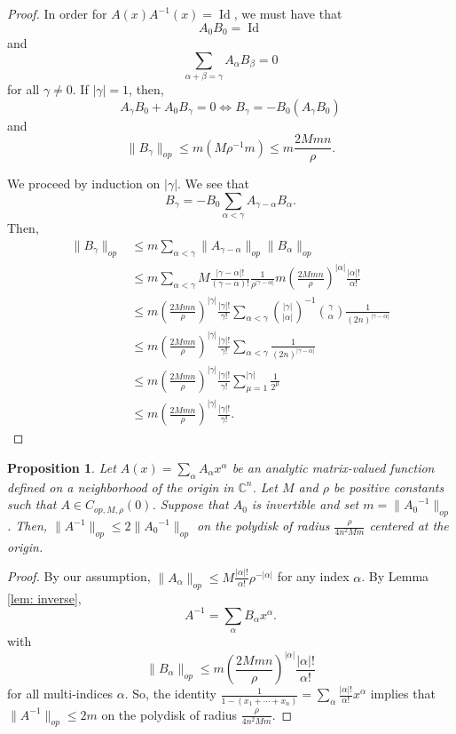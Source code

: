 \documentclass{amsart}
\newtheorem{prop}[thm]{Proposition}
\theoremstyle{definition}
\theoremstyle{remark}
\numberwithin{equation}{section}
\DeclareMathOperator{\Id}{Id}
\begin{document}
\begin{proof}

In order for $A(x)A^{-1}(x) = \Id$, we must have that 
$$
A_0 B_0 = \Id
$$
and 
$$
\sum_{\alpha + \beta = \gamma} A_\alpha B_\beta = 0
$$
for all $\gamma \neq 0$. If $|\gamma| = 1$, then,
$$
A_\gamma B_0 + A_0 B_\gamma = 0 \iff B_\gamma = - B_0( A_\gamma B_0)
$$
and
$$
\|B_\gamma\|_{op} \leq m (M\rho^{-1}m) \leq m \frac{2Mmn}{\rho}.
$$


We proceed by induction on $|\gamma|$. We see that
$$
B_\gamma = - B_0  \sum_{\alpha < \gamma} A_{\gamma - \alpha} B_\alpha .
$$
Then, 
\begin{align*}
\| B_\gamma \|_{op} & \leq m  \sum_{\alpha < \gamma} \| A_{\gamma - \alpha}\|_{op} \|B_\alpha\|_{op} \\
    & \leq m  \sum_{\alpha < \gamma} M \frac{ |\gamma - \alpha|!}{(\gamma - \alpha)!} \frac{1}{\rho^{|\gamma - \alpha|}} m \left ( \frac{2 M mn}{\rho} \right )^{|\alpha|} \frac{ |\alpha|!}{\alpha!} \\
    & \leq m \left ( \frac{2M mn}{\rho} \right )^{|\gamma|} \frac{ |\gamma|!}{\gamma!} \sum_{\alpha < \gamma}  \binom{|\gamma|}{|\alpha|}^{-1} \binom{\gamma}{\alpha}   \frac{1}{ (2n)^{|\gamma - \alpha|}} \\
    & \leq m \left ( \frac{2M mn}{\rho} \right )^{|\gamma|} \frac{ |\gamma|!}{\gamma!} \sum_{\alpha < \gamma}  \frac{1}{ (2n)^{|\gamma - \alpha|}} \\
    & \leq m \left ( \frac{2M mn}{\rho} \right )^{|\gamma|} \frac{ |\gamma|!}{\gamma!} \sum_{\mu = 1}^{|\gamma|}  \frac{1}{ 2^\mu} \\
    & \leq m \left ( \frac{2M mn}{\rho} \right )^{|\gamma|} \frac{ |\gamma|!}{\gamma!}.
\end{align*}


\end{proof}

\begin{prop} \label{prop: inverse}
Let $A(x) = \sum_{\alpha} A_\alpha x^\alpha$ be an analytic matrix-valued function defined on a neighborhood of the origin in $\mathbb{C}^n$. Let $M$ and $\rho$ be positive constants such that $A \in C_{op,M,\rho}(0)$. Suppose that $A_0$ is invertible and set $m = \|{A_0}^{-1}\|_{op}$. Then, $\|A^{-1}\|_{op} \leq 2\|{A_0}^{-1}\|_{op}$ on the polydisk of radius $\frac{\rho}{4n^2Mm}$ centered at the origin.
\end{prop}

\begin{proof}
By our assumption, $\|A_\alpha\|_{op} \leq M \frac{|\alpha|!}{\alpha!} \rho^{-|\alpha|}$ for any index $\alpha$. By Lemma \ref{lem: inverse},
$$
A^{-1} = \sum_{\alpha} B_\alpha x^\alpha.
$$
with 
$$
\|B_\alpha\|_{op} \leq m \left ( \frac{2 M m n}{\rho} \right )^{|\alpha|} \frac{ |\alpha|!}{\alpha!}
$$
for all multi-indices $\alpha$. So, the identity $\frac{1}{1 - (x_1 + \dotsb + x_n)} = \sum_{\alpha} \frac{|\alpha|!}{\alpha!}x^\alpha$ implies that $\|A^{-1}\|_{op} \leq 2m$ on the polydisk of radius $\frac{\rho}{4n^2Mm}$.
\end{proof}
\end{document}
